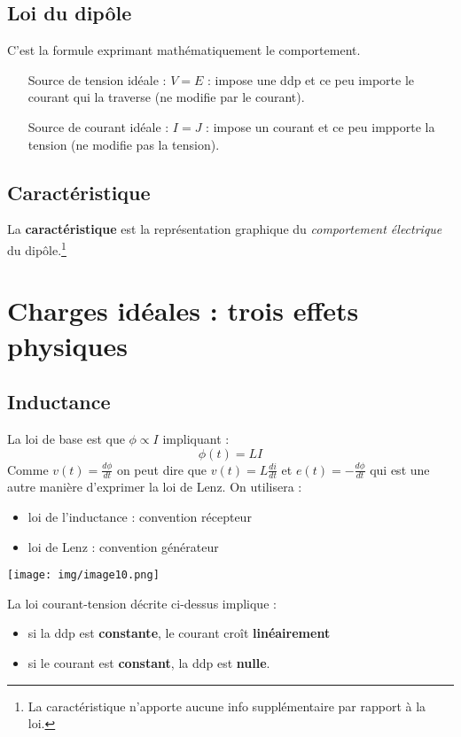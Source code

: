 \documentclass	[11pt, a4paper, openany]{book}
\begin{document}
	\subsection{Loi du dipôle}
	C'est la formule exprimant mathématiquement le comportement.
	\begin{itemize}
		\item[Source de tension idéale] : $V = E$ : impose une ddp et ce peu importe le courant qui la traverse (ne modifie par le courant).
		\item[Source de courant idéale] : $I = J$ : impose un courant et ce peu impporte la tension (ne modifie pas la tension).
	\end{itemize}
	
	\subsection{Caractéristique}
	La \textbf{caractéristique} est la représentation graphique du \textit{comportement électrique} du dipôle.\footnote{La caractéristique n'apporte aucune info supplémentaire par rapport à la loi.}
	
	\setcounter{section}{2}
	\section{Charges idéales : trois effets physiques}
	\setcounter{subsection}{1}
	\subsection{Inductance}
	La loi de base est que $\phi \propto I$ impliquant :
	\begin{equation}
		\phi (t) = LI
	\end{equation}
	Comme $v(t) = \frac{d\phi}{dt}$ on peut dire que $v(t) = L\frac{di}{dt}$ et $e(t) = -\frac{d\phi}{dt}$ qui est une autre manière d'exprimer la loi de Lenz. On utilisera :
	\begin{itemize}
		\item loi de l'inductance : convention récepteur
		\item loi de Lenz : convention générateur
	\end{itemize}
	
	\begin{center}
		\texttt{[image: img/image10.png]}
	\end{center}
	
	La loi courant-tension décrite ci-dessus implique :
	\begin{itemize}
		\item si la ddp est \textbf{constante}, le courant croît \textbf{linéairement}
		\item si le courant est \textbf{constant}, la ddp est \textbf{nulle}.
	\end{itemize}
	
\end{document}
